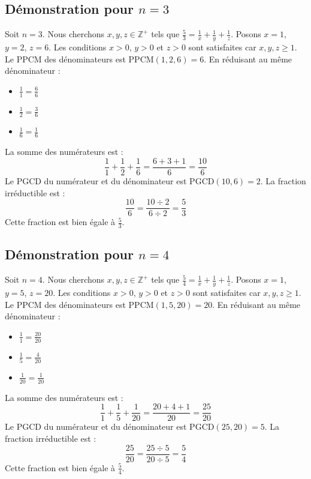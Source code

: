 \documentclass[11pt,a4paper]{article}
\begin{document}
\subsection{Démonstration pour $n = 3$}
Soit $n = 3$. Nous cherchons $x, y, z \in \mathbb{Z}^{+}$ tels que $\frac{5}{3} = \frac{1}{x} + \frac{1}{y} + \frac{1}{z}$.
Posons $x = 1$, $y = 2$, $z = 6$.
Les conditions $x > 0$, $y > 0$ et $z > 0$ sont satisfaites car $x, y, z \geq 1$.
Le PPCM des dénominateurs est $\text{PPCM}(1, 2, 6) = 6$.
En réduisant au même dénominateur :
\begin{itemize}
    \item $\frac{1}{1} = \frac{6}{6}$
    \item $\frac{1}{2} = \frac{3}{6}$
    \item $\frac{1}{6} = \frac{1}{6}$
\end{itemize}
La somme des numérateurs est :
$$ \frac{1}{1} + \frac{1}{2} + \frac{1}{6} = \frac{6 + 3 + 1}{6} = \frac{10}{6} $$
Le PGCD du numérateur et du dénominateur est $\text{PGCD}(10, 6) = 2$.
La fraction irréductible est :
$$ \frac{10}{6} = \frac{10 \div 2}{6 \div 2} = \frac{5}{3} $$
Cette fraction est bien égale à $\frac{5}{3}$.

\subsection{Démonstration pour $n = 4$}
Soit $n = 4$. Nous cherchons $x, y, z \in \mathbb{Z}^{+}$ tels que $\frac{5}{4} = \frac{1}{x} + \frac{1}{y} + \frac{1}{z}$.
Posons $x = 1$, $y = 5$, $z = 20$.
Les conditions $x > 0$, $y > 0$ et $z > 0$ sont satisfaites car $x, y, z \geq 1$.
Le PPCM des dénominateurs est $\text{PPCM}(1, 5, 20) = 20$.
En réduisant au même dénominateur :
\begin{itemize}
    \item $\frac{1}{1} = \frac{20}{20}$
    \item $\frac{1}{5} = \frac{4}{20}$
    \item $\frac{1}{20} = \frac{1}{20}$
\end{itemize}
La somme des numérateurs est :
$$ \frac{1}{1} + \frac{1}{5} + \frac{1}{20} = \frac{20 + 4 + 1}{20} = \frac{25}{20} $$
Le PGCD du numérateur et du dénominateur est $\text{PGCD}(25, 20) = 5$.
La fraction irréductible est :
$$ \frac{25}{20} = \frac{25 \div 5}{20 \div 5} = \frac{5}{4} $$
Cette fraction est bien égale à $\frac{5}{4}$.
\end{document}
